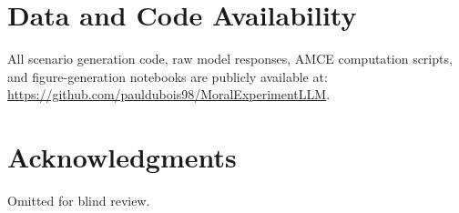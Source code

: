 \documentclass[letterpaper]{article}
\begin{document}
\section*{Data and Code Availability}

All scenario generation code, raw model responses, AMCE computation scripts, and
figure-generation notebooks are publicly available at:\\
\url{https://github.com/pauldubois98/MoralExperimentLLM}.

\section*{Acknowledgments}
Omitted for blind review.



\end{document}
